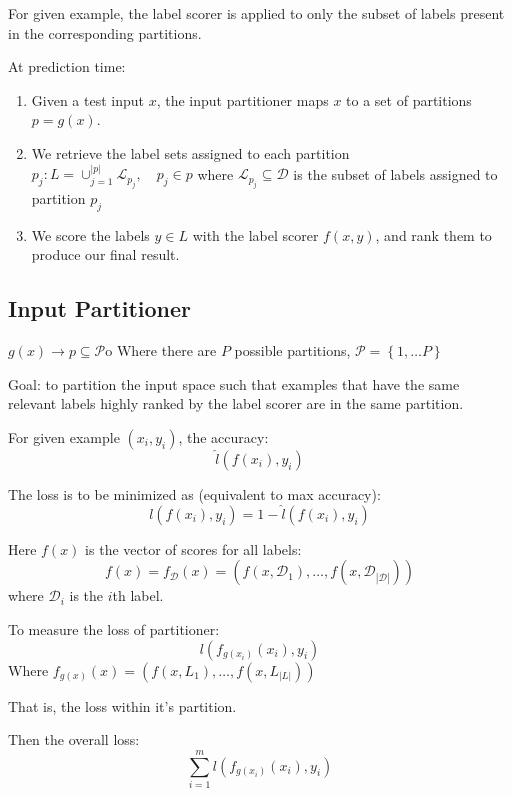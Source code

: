 For given example, the label scorer is applied to only the subset of
labels present in the corresponding partitions.

At prediction time:

\begin{enumerate}
    \item Given a test input $x$, the input partitioner maps $x$ to a set
        of partitions $p = g(x)$.
    \item We retrieve the label sets assigned to each partition $p_j: L =
        \cup_{j=1}^{|p|} \mathcal{L}_{p_j}, \quad p_j \in p$ where $\mathcal{L}_{p_j}
        \subseteq \mathcal{D}$ is the subset of labels assigned to
        partition $p_j$
    \item We score the labels $y \in L$ with the label scorer $f(x,y)$,
        and rank them to produce our final result.
\end{enumerate}

\subsection{Input Partitioner}
$g(x) \rightarrow p \subseteq \mathcal{P}$o
Where there are $P$ possible partitions, $\mathcal{P} = \left\{ 1, \dots P
\right\}$

Goal: to partition the input space such that examples that have the same
relevant labels highly ranked by the label scorer are in the same
partition.

For given example $(x_i, y_i)$, the accuracy:
\[\hat{l}(f(x_i), y_i)\]

The loss is to be minimized as (equivalent to max accuracy):
\begin{equation}
    l(f(x_i), y_i) = 1- \hat{l}(f(x_i), y_i)
\end{equation}

Here $f(x)$ is the vector of scores for all labels:
\[ f(x) = f_{\mathcal{D}}(x) = \left( f(x, \mathcal{D}_1), \dots,
f(x, \mathcal{D}_{|\mathcal{D}|}) \right)\]
where $\mathcal{D}_i$ is the $i$th label.

To measure the loss of partitioner:
\begin{equation}
    l(f_{g(x_i)}(x_i), y_i)
\end{equation}
Where $f_{g(x)}(x) = \left( f(x, L_1), \dots, f(x, L_{|L|}) \right)$

That is, the loss within it's partition.

Then the overall loss:
\begin{equation}
    \sum_{i=1}^m l(f_{g(x_i)}(x_i), y_i)
\end{equation}

